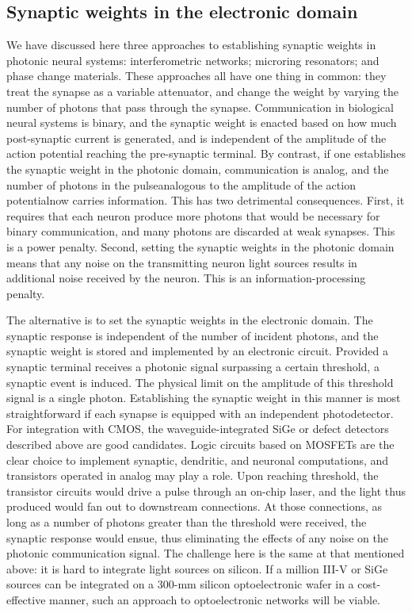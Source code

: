 \documentclass[twocolumn]{article}
\begin{document}
\subsection{Synaptic weights in the electronic domain}
We have discussed here three approaches to establishing synaptic weights in photonic neural systems: interferometric networks; microring resonators; and phase change materials. These approaches all have one thing in common: they treat the synapse as a variable attenuator, and change the weight by varying the number of photons that pass through the synapse. Communication in biological neural systems is binary, and the synaptic weight is enacted based on how much post-synaptic current is generated, and is independent of the amplitude of the action potential reaching the pre-synaptic terminal. By contrast, if one establishes the synaptic weight in the photonic domain, communication is analog, and the number of photons in the pulse\textemdash analogous to the amplitude of the action potential\textemdash now carries information. This has two detrimental consequences. First, it requires that each neuron produce more photons that would be necessary for binary communication, and many photons are discarded at weak synapses. This is a power penalty. Second, setting the synaptic weights in the photonic domain means that any noise on the transmitting neuron light sources results in additional noise received by the neuron. This is an information-processing penalty.

The alternative is to set the synaptic weights in the electronic domain. The synaptic response is independent of the number of incident photons, and the synaptic weight is stored and implemented by an electronic circuit. Provided a synaptic terminal receives a photonic signal surpassing a certain threshold, a synaptic event is induced. The physical limit on the amplitude of this threshold signal is a single photon. Establishing the synaptic weight in this manner is most straightforward if each synapse is equipped with an independent photodetector. For integration with CMOS, the waveguide-integrated SiGe or defect detectors described above are good candidates. Logic circuits based on MOSFETs are the clear choice to implement synaptic, dendritic, and neuronal computations, and transistors operated in analog may play a role. Upon reaching threshold, the transistor circuits would drive a pulse through an on-chip laser, and the light thus produced would fan out to downstream connections. At those connections, as long as a number of photons greater than the threshold were received, the synaptic response would ensue, thus eliminating the effects of any noise on the photonic communication signal. The challenge here is the same at that mentioned above: it is hard to integrate light sources on silicon. If a million III-V or SiGe sources can be integrated on a 300-mm silicon optoelectronic wafer in a cost-effective manner, such an approach to optoelectronic networks will be viable.
\end{document}
